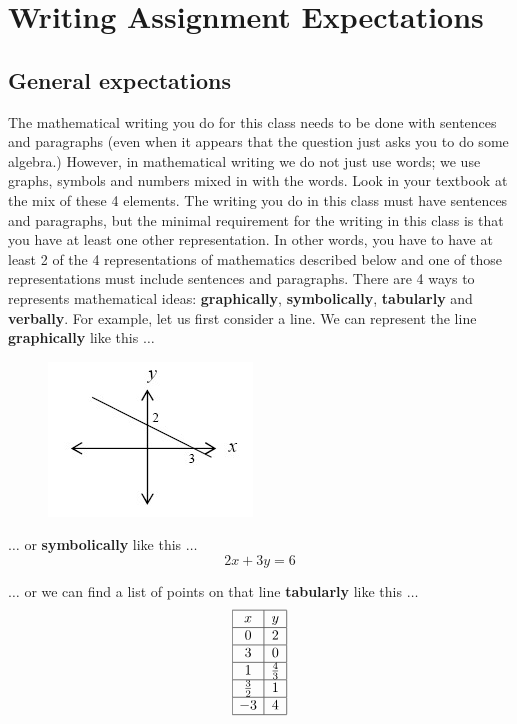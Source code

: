 \chapter{Writing Assignment Expectations}

\section{General expectations}

The mathematical writing you do for this class needs to be done with sentences and paragraphs (even when it appears that the question just asks you to do some algebra.)  However, in mathematical writing we do not just use words; we use graphs, symbols and numbers mixed in with the words.  Look in your textbook at the mix of these 4 elements. The writing you do in this class must have sentences and paragraphs, but the minimal requirement for the writing in this class is that you have at least one other representation.  In other words, you have to have at least 2 of the 4 representations of mathematics described below and one of those representations must include sentences and paragraphs.
 There are 4 ways to represents mathematical ideas:  {\bf{graphically}}, {\bf{symbolically}}, {\bf{tabularly}} and {\bf{verbally}}.  For example, let us first consider a line.  We can represent the line {\bf{graphically}} like this $\ldots$
\begin{figure}[h]
	\centering
		\includegraphics{TeXGraphics/ExpectationsFigurea.jpg}
	\label{Expectations}
\end{figure}

$\ldots$ or {\bf{symbolically}} like this $\ldots$
 $$2x + 3y = 6$$
 
$\ldots$ or we can find a list of points on that line {\bf{tabularly}} like this $\ldots$
 $$\begin{array}{|c|c|}
 \hline
   x & y  \\ \hline
   0 & 2  \\ \hline
   3 & 0  \\ \hline
   1 & {{\textstyle{4 \over 3}}}  \\ \hline
   {{\textstyle{3 \over 2}}} & 1  \\ \hline
    {- 3} & 4 \\ \hline
 \end{array}$$


